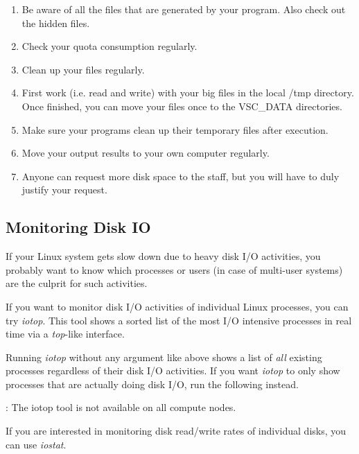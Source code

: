 \begin{enumerate}
\item  Be aware of all the files that are generated by your program. Also check out the hidden files.
\item  Check your quota consumption regularly.
\item  Clean up your files regularly.
\item  First work (i.e. read and write) with your big files in the local /tmp directory. Once finished, you can move your files once to the VSC\_DATA directories.
\item  Make sure your programs clean up their temporary files after execution.
\item  Move your output results to your own computer regularly.
\item  Anyone can request more disk space to the \hpc staff, but you will have to duly justify your request.
\end{enumerate}

\subsection{Monitoring Disk IO}

If your Linux system gets slow down due to heavy disk I/O activities, you
probably want to know which processes or users (in case of multi-user systems)
are the culprit for such activities.

If you want to monitor disk I/O activities of individual Linux processes, you
can try \emph{iotop}. This tool shows a sorted list of the most I/O intensive
processes in real time via a \emph{top}-like interface.

\begin{prompt}
\end{prompt}

Running \emph{iotop} without any argument like above shows a list of \emph{all}
existing processes regardless of their disk I/O activities. If you want
\emph{iotop} to only show processes that are actually doing disk I/O, run the
following instead.

\begin{prompt}
\end{prompt}

: The iotop tool is not available on all compute nodes.

If you are interested in monitoring disk read/write rates of individual disks,
you can use \emph{iostat}.

